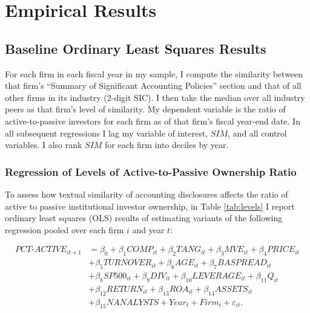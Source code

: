 \documentclass[thesis]{thesis-umich}
\begin{document}
\chapter{Empirical Results}\label{chap:results}
\section{Baseline Ordinary Least Squares Results}\label{sec:ols}
For each firm in each fiscal year in my sample, I compute the similarity between that firm's ``Summary of Significant Accounting Policies'' section and that of all other firms in its industry (2-digit SIC). I then take the median over all industry peers as that firm's level of similarity. My dependent variable is the ratio of active-to-passive investors for each firm as of that firm's fiscal year-end date. In all subsequent regressions I lag my variable of interest, $SIM$, and all control variables. I also rank $SIM$ for each firm into deciles by year.

\subsection{Regression of Levels of Active-to-Passive Ownership Ratio} 
To assess how textual similarity of accounting disclosures affects the ratio of active to passive institutional investor ownership, in Table \ref{tab:levels} I report ordinary least squares (OLS) results of estimating variants of the following regression pooled over each firm $i$ and year $t$: 

\begin{equation} \label{eq:active-comp-ols} 
\begin{aligned} 
PCT\text{-}ACTIVE_{it+1} &=
\beta_{0} + \beta_{1}COMP_{it} + \beta_{2}TANG_{it} + \beta_{3}MVE_{it} + \beta_{4}PRICE_{it} \\ & +
\beta_{5}TURNOVER_{it} + \beta_{6}AGE_{it} + \beta_{7}BASPREAD_{it} \\ &+ \beta_{8}SP500_{it} +
\beta_{9}DIV_{it} + \beta_{10}LEVERAGE_{it} + \beta_{11}Q_{it} \\ &+ \beta_{12}RETURN_{it} +
\beta_{13}ROA_{it} + \beta_{14}ASSETS_{it} \\ &+ \beta_{15}NANALYSTS + Year_{t} + Firm_{i} + \varepsilon_{it}. 
\end{aligned}
\end{equation}
\end{document}
